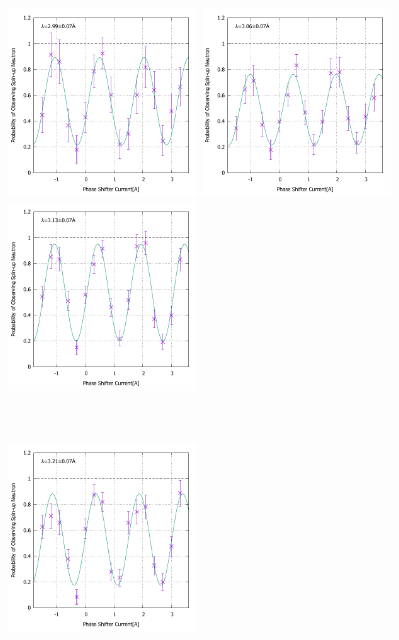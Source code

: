 \begin{figure}[h]
\begin{minipage}{0.33\hsize}
\includegraphics[width=5cm]{discussion/IF_rb/Interference_rb_fit420.pdf}
\end{minipage}
\begin{minipage}{0.33\hsize}
\includegraphics[width=5cm]{discussion/IF_rb/Interference_rb_fit430.pdf}
\end{minipage}
\begin{minipage}{0.33\hsize}
\includegraphics[width=5cm]{discussion/IF_rb/Interference_rb_fit440.pdf}
\end{minipage}\\
\begin{minipage}{0.33\hsize}
\includegraphics[width=5cm]{discussion/IF_rb/Interference_rb_fit450.pdf}

\end{minipage}
\end{figure}
